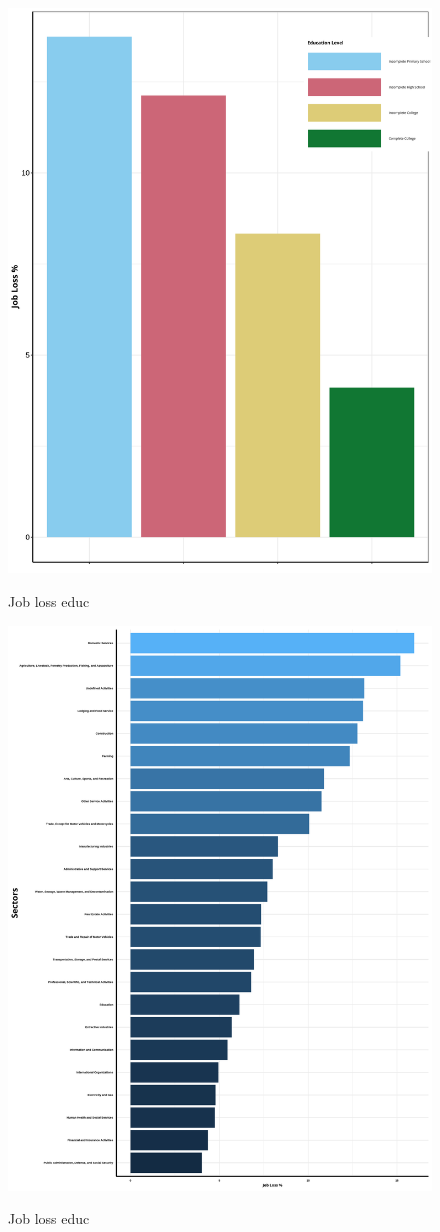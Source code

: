\documentclass[a4paper]{article}
\begin{document}
\begin{figure}[hb]
  \centering
  \caption{Job loss educ}
  \includegraphics[width=0.85\linewidth]{../analysis/output/graph/_graph_job_loss_educ.png}
  \label{fig:_graph_job_loss_educ}
\end{figure}

\begin{figure}[hb]
  \centering
  \caption{Job loss educ}
  \includegraphics[width=0.85\linewidth]{../analysis/output/graph/_graph_job_loss_sectors.png}
  \label{fig:_graph_job_loss_sectors}
\end{figure}
\end{document}
